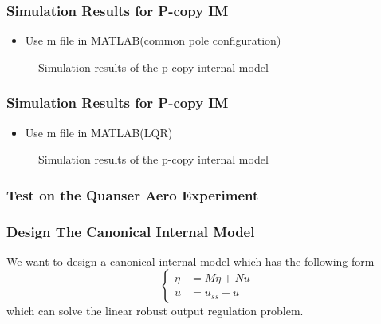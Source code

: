 \documentclass{beamer}
\begin{document}
    
\begin{frame}[fragile]
    \frametitle{{\color{red} Simulation Results for P-copy IM}}
    \begin{itemize}
      \item {\color{blue} Use m file in MATLAB(common pole configuration)}
    \end{itemize}
    \begin{figure}[h]
     \centering
     \caption{Simulation results of the p-copy internal model}
     \label{fig:subfig}
    \end{figure}
\end{frame}


\begin{frame}[fragile]
    \frametitle{{\color{red} Simulation Results for P-copy IM}}
    \begin{itemize}
      \item {\color{blue} Use m file in MATLAB(LQR)}
    \end{itemize}
    \begin{figure}[h]
     \centering
     \caption{Simulation results of the p-copy internal model}
     \label{fig:subfig}
    \end{figure}
\end{frame}


\begin{frame}[fragile]
    \frametitle{{\color{red} Test on the Quanser Aero Experiment}}

\end{frame}


\begin{frame}[fragile]
    \frametitle{{\color{red} Design The Canonical Internal Model}}
    We want to design a canonical internal model which has the following form
    \begin{equation}\label{can}
      \left\{\begin{aligned}
               \dot{\eta} &= M\eta+Nu \\
               u &= u_{ss}+\bar{u}
             \end{aligned}\right.
    \end{equation}
    which can solve the linear robust output regulation problem.
\end{frame}
\end{document}
